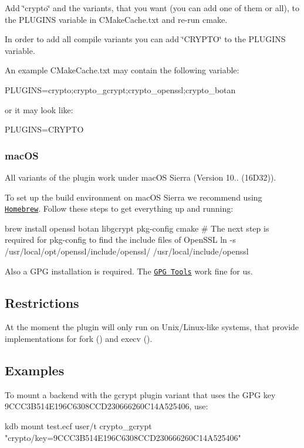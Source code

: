 Add \char`\"{}crypto\char`\"{} and the variants, that you want (you can add one of them or all), to the {\ttfamily P\+L\+U\+G\+I\+NS} variable in {\ttfamily C\+Make\+Cache.\+txt} and re-\/run {\ttfamily cmake}.

In order to add all compile variants you can add \char`\"{}\+C\+R\+Y\+P\+T\+O\char`\"{} to the {\ttfamily P\+L\+U\+G\+I\+NS} variable.

An example {\ttfamily C\+Make\+Cache.\+txt} may contain the following variable\+: \begin{DoxyVerb}PLUGINS=crypto;crypto_gcrypt;crypto_openssl;crypto_botan
\end{DoxyVerb}


or it may look like\+: \begin{DoxyVerb}PLUGINS=CRYPTO
\end{DoxyVerb}


\subsubsection*{mac\+OS}

All variants of the plugin work under mac\+OS Sierra (Version 10.. (16\+D32)).

To set up the build environment on mac\+OS Sierra we recommend using \href{http://brew.sh/}{\tt Homebrew}. Follow these steps to get everything up and running\+: \begin{DoxyVerb}brew install openssl botan libgcrypt pkg-config cmake
# The next step is required for pkg-config to find the include files of OpenSSL
ln -s /usr/local/opt/openssl/include/openssl/ /usr/local/include/openssl
\end{DoxyVerb}


Also a G\+PG installation is required. The \href{https://gpgtools.org}{\tt G\+PG Tools} work fine for us.

\subsection*{Restrictions}

At the moment the plugin will only run on Unix/\+Linux-\/like systems, that provide implementations for {\ttfamily fork ()} and {\ttfamily execv ()}.

\subsection*{Examples}

To mount a backend with the gcrypt plugin variant that uses the G\+PG key 9\+C\+C\+C3\+B514\+E196\+C6308\+C\+C\+D230666260\+C14\+A525406, use\+: \begin{DoxyVerb}kdb mount test.ecf user/t crypto_gcrypt "crypto/key=9CCC3B514E196C6308CCD230666260C14A525406"
\end{DoxyVerb}


